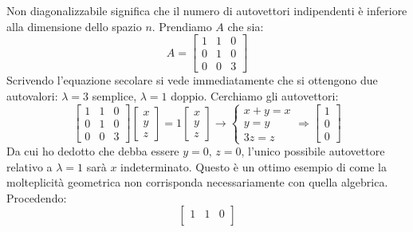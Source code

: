 \begin{exmp}
    Non diagonalizzabile significa che il numero di autovettori indipendenti è inferiore alla dimensione dello spazio $n$. Prendiamo $A$ che sia:
    \begin{equation*}
        A=
        \begin{bmatrix}
            1 & 1 & 0 \\
            0 & 1 & 0 \\
            0 & 0 & 3
        \end{bmatrix}
    \end{equation*}
    Scrivendo l'equazione secolare si vede immediatamente che si ottengono due autovalori: $\lambda=3$ semplice, $\lambda=1$ doppio. Cerchiamo gli autovettori:
    \begin{equation*}
        \begin{bmatrix}
            1 & 1 & 0 \\
            0 & 1 & 0 \\
            0 & 0 & 3
        \end{bmatrix}
        \begin{bmatrix}
            x \\ y \\ z
        \end{bmatrix} =
        1
        \begin{bmatrix}
            x \\ y \\ z
        \end{bmatrix} \longrightarrow
        \begin{cases}
            x+y=x \\
            y=y \\
            3z=z
        \end{cases} \Longrightarrow
        \begin{bmatrix}
            1 \\ 0 \\ 0
        \end{bmatrix}
    \end{equation*}
    Da cui ho dedotto che debba essere $y=0, \, z=0$, l'unico possibile autovettore relativo a $\lambda=1$ sarà $x$ indeterminato. Questo è un ottimo esempio di come la molteplicità geometrica non corrisponda necessariamente con quella algebrica. Procedendo:
    \begin{equation*}
        \begin{bmatrix}
            1 & 1 & 0 \\

\end{bmatrix}
\end{equation*}
\end{exmp}

